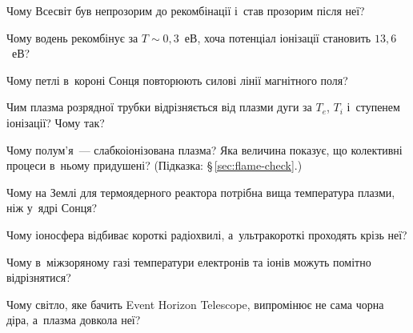 \begin{Questions}
\begin{quizlist}
\item Чому Всесвіт був непрозорим до рекомбінації і~став прозорим після неї?

\item Чому водень рекомбінує за $T\sim0{,}3$~еВ, хоча потенціал іонізації становить $13{,}6$~еВ?

\item Чому петлі в~короні Сонця повторюють силові лінії магнітного поля?

\item Чим плазма розрядної трубки відрізняється від плазми дуги за $T_e$, $T_i$ і~ступенем іонізації? Чому так?

\item Чому полум'я~--- слабкоіонізована плазма? Яка величина показує, що колективні процеси в~ньому придушені? (Підказка: §\,\ref{sec:flame-check}.)

\item Чому на Землі для термоядерного реактора потрібна вища температура плазми, ніж у~ядрі Сонця?

\item Чому іоносфера відбиває короткі радіохвилі, а~ультракороткі проходять крізь неї?

\item Чому в~міжзоряному газі температури електронів та іонів можуть помітно відрізнятися?

\item Чому світло, яке бачить Event Horizon Telescope, випромінює не сама чорна діра, а~плазма довкола неї?
\end{quizlist}
\end{Questions}
